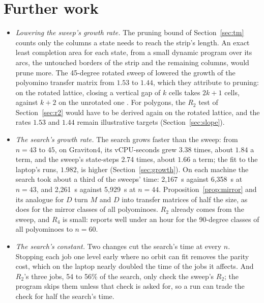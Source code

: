 \documentclass[11pt]{a000104}
\numberwithin{equation}{section}
\begin{document}
\section{Further work}\label{sec:further}

\begin{itemize}
  \item \emph{Lowering the sweep's growth rate.} The pruning bound of Section~\ref{sec:tm} counts only the columns a state needs to reach the strip's length. An exact least completion area for each state, from a small dynamic program over its arcs, the untouched borders of the strip and the remaining columns, would prune more. The 45-degree rotated sweep of \textcite{BarequetBenShachar:2026} lowered the growth of the polyomino transfer matrix from $1.53$ to $1.44$, which they attribute to pruning: on the rotated lattice, closing a vertical gap of $k$ cells takes $2k + 1$ cells, against $k + 2$ on the unrotated one \parencite[Sect.~5]{BarequetBenShachar:2026}. For polygons, the $R_2$ test of Section~\ref{sec:r2} would have to be derived again on the rotated lattice, and the rates $1.53$ and $1.44$ remain illustrative targets (Section~\ref{sec:slope}).
  \item \emph{The search's growth rate.} The search grows faster than the sweep: from $n = 43$ to $45$, on Graviton4, its vCPU-seconds grew 3.38 times, about $1.84$ a term, and the sweep's state-steps 2.74 times, about $1.66$ a term; the fit to the laptop's runs, $1.982$, is higher (Section~\ref{sec:growth}). On each machine the search took about a third of the sweeps' time: 2{,}167~s against 6{,}358~s at $n = 43$, and 2{,}261~s against 5{,}929~s at $n = 44$. Proposition~\ref{prop:mirror} and its analogue for $D$ turn $M$ and $D$ into transfer matrices of half the size, as \textcite{Shirakawa:2025} does for the mirror classes of all polyominoes. $R_2$ already comes from the sweep, and $R_4$ is small: \textcite[Table~2]{Shirakawa:2025} reports well under an hour for the 90-degree classes of all polyominoes to $n = 60$.
  \item \emph{The search's constant.} Two changes cut the search's time at every $n$. Stopping each job one level early where no orbit can fit removes the parity cost, which on the laptop nearly doubled the time of the jobs it affects. And $R_2$'s three jobs, 54 to 56\% of the search, only check the sweep's $R_2$; the program skips them unless that check is asked for, so a run can trade the check for half the search's time.

\end{itemize}
\end{document}
